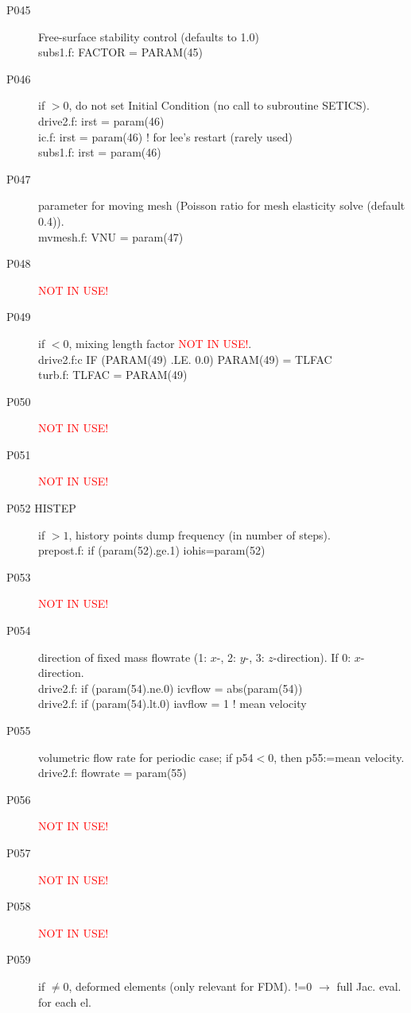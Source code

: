 \begin{description}
\item [P045  ] Free-surface stability control (defaults to 1.0)\\
subs1.f:      FACTOR = PARAM(45)
\item [P046  ] if \(>0\), do not set Initial Condition (no call to subroutine SETICS).\\
drive2.f:      irst = param(46)\\
ic.f:      irst = param(46)        ! for lee's restart (rarely used)\\
subs1.f:      irst = param(46)
\item [P047  ] parameter for moving mesh (Poisson ratio for mesh elasticity solve (default 0.4)).\\
mvmesh.f:      VNU    = param(47)
\item [P048  ] {\textcolor{red}{ NOT IN USE!}}
\item [P049  ] if \(<0\), mixing length factor {\textcolor{red}{ NOT IN USE!}}.\\
drive2.f:c     IF (PARAM(49) .LE. 0.0) PARAM(49) = TLFAC\\
turb.f:      TLFAC = PARAM(49)
\item [P050  ] {\textcolor{red}{ NOT IN USE!}}
\item [P051  ] {\textcolor{red}{ NOT IN USE!}}
\item [P052  HISTEP] if \(>1\), history points dump frequency (in number of steps).\\
prepost.f:      if (param(52).ge.1) iohis=param(52)
\item [P053  ] {\textcolor{red}{ NOT IN USE!}}
\item [P054  ] direction of fixed mass flowrate (1: \(x\)-, 2: \(y\)-, 3: \(z\)-direction). If 0: \(x\)-direction.\\
drive2.f:      if (param(54).ne.0) icvflow = abs(param(54))\\
drive2.f:      if (param(54).lt.0) iavflow = 1 ! mean velocity
\item [P055  ] volumetric flow rate for periodic case;  if p54\(<0\), then p55:=mean velocity.\\
drive2.f:      flowrate = param(55)
\item [P056  ] {\textcolor{red}{ NOT IN USE!}}
\item [P057  ] {\textcolor{red}{ NOT IN USE!}}
\item [P058  ] {\textcolor{red}{ NOT IN USE!}}
\item [P059  ] if \(\neq0\), deformed elements (only relevant for FDM). !=0 \(\rightarrow\) full Jac. eval. for each el.

\end{description}
